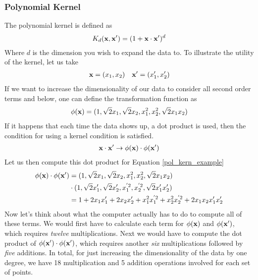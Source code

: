 \subsubsection{Polynomial Kernel}
The polynomial kernel is defined as
\begin{align}\label{pol_kern}
	K_d(\textbf{x},\textbf{x}') = (1+ \textbf{x}\cdot \textbf{x}')^d
\end{align}
Where $d$ is the dimension you wish to expand the data to. To illustrate the utility of the kernel, let us take
\begin{align}\label{pol_kern_example}
	\textbf{x} = (x_1,x_2) && \textbf{x}' = (x_1',x_2')
\end{align}
If we want to increase the dimensionality of our data to consider all second order terms and below, one can define the transformation function as
\begin{align}
	\phi(\textbf{x}) = (1, \sqrt{2}x_1, \sqrt{2}x_2, x_1^2, x_2^2, \sqrt{2}x_1x_2)
\end{align}
If it happens that each time the data shows up, a dot product is used, then the condition for using a kernel condition is satisfied.
\begin{align}
	\textbf{x}\cdot \textbf{x}' \rightarrow \phi(\textbf{x})\cdot \phi(\textbf{x}')
\end{align}
Let us then compute this dot product for Equation \ref{pol_kern_example}
\begin{align}
	\phi(\textbf{x})\cdot \phi(\textbf{x}') &= (1, \sqrt{2}x_1, \sqrt{2}x_2, x_1^2, x_2^2, \sqrt{2}x_1x_2) \\
	&\cdot (1, \sqrt{2}x_1', \sqrt{2}x_2', x_1^{'2}, x_2^{'2}, \sqrt{2}x_1'x_2')\\
	&= 1 + 2x_1x_1' + 2x_2x_2' + x_1^2x_1^{'2}+x_2^2x_2^{'2} + 2x_1x_2x_1'x_2' \label{pol_kern_expand}
\end{align}
Now let's think about what the computer actually has to do to compute all of these terms. We would first have to calculate each term for $\phi(\textbf{x})$ and $\phi(\textbf{x}')$, which requires \emph{twelve} multiplications. Next we would have to compute the dot product of $\phi(\textbf{x}')\cdot\phi(\textbf{x}')$, which requires another \emph{six} multiplications followed by \emph{five} additions. In total, for just increasing the dimensionality of the data by one degree, we have 18 multiplication and 5 addition operations involved for each set of points.

